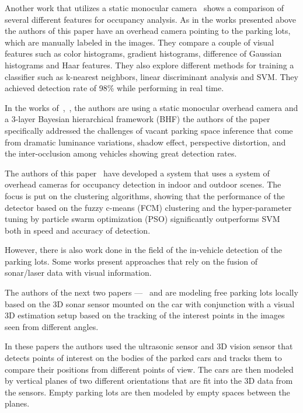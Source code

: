 Another work that utilizes a static monocular camera~\cite{tschentscher} shows a
comparison of several different features for occupancy analysis. As in the works
presented above the authors of this paper have an overhead camera pointing to
the parking lots, which are manually labeled in the images. They compare a
couple of visual features such as color histograms, gradient histograms,
difference of Gaussian histograms and Haar features. They also explore different
methods for training a classifier such as k-nearest neighbors, linear
discriminant analysis and SVM. They achieved detection rate of 98\% while
performing in real time.

In the works of~\cite{chingchun10},~\cite{chingjao10}, the authors are using a
static monocular overhead camera and a 3-layer Bayesian hierarchical framework
 (BHF) the authors of the paper specifically addressed the challenges of vacant
parking space inference that come from dramatic luminance variations, shadow
effect, perspective distortion, and the inter-occlusion among vehicles showing
great detection rates.

The authors of this paper~\cite{ichihashi} have developed a system that uses a
system of overhead cameras for occupancy detection in indoor and outdoor scenes.
The focus is put on the clustering algorithms, showing that the performance of
the detector based on the fuzzy c-means (FCM) clustering and the hyper-parameter
tuning by particle swarm optimization (PSO) significantly outperforms SVM both
in speed and accuracy of detection.

However, there is also work done in the field of the in-vehicle detection of
the parking lots. Some works present approaches that rely on the fusion of
sonar/laser data with visual information.

The authors of the next two papers ---~\cite{fintyelvestri} and
\cite{abadvestri} are modeling free parking lots locally based on the 3D sonar
sensor mounted on the car with conjunction with a visual 3D estimation setup
based on the tracking of the interest points in the images seen from different
angles.

In these papers the authors used the ultrasonic sensor and 3D vision sensor that
detects points of interest on the bodies of the parked cars and tracks them to
compare their positions from different points of view. The cars are then
modeled by vertical planes of two different orientations that are fit into the
3D data from the sensors. Empty parking lots are then modeled by empty spaces
between the planes.

